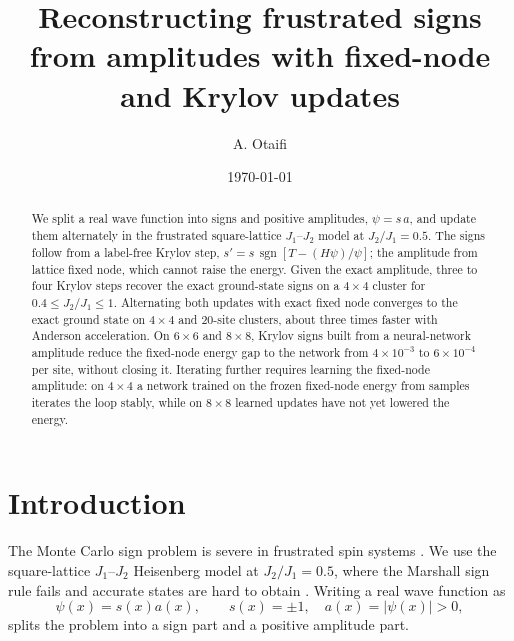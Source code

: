 \documentclass[aps,prb,reprint,onecolumn,superscriptaddress,floatfix]{revtex4-2}
\begin{document}
\title{Reconstructing frustrated signs from amplitudes with fixed-node and Krylov updates}

\author{A. Otaifi}
\date{\today}

\begin{abstract}
We split a real wave function into signs and positive amplitudes,
$\psi=s\,a$, and update them alternately in the frustrated square-lattice
$J_1$--$J_2$ model at $J_2/J_1=0.5$. The signs follow from a label-free
Krylov step, $s'=s\,\operatorname{sgn}[T-(H\psi)/\psi]$; the amplitude from
lattice fixed node, which cannot raise the energy. Given the exact amplitude,
three to four Krylov steps recover the exact ground-state signs on a
$4\times4$ cluster for $0.4\leq J_2/J_1\leq1$. Alternating both updates with
exact fixed node converges to the exact ground state on $4\times4$ and
20-site clusters, about three times faster with Anderson acceleration. On
$6\times6$ and $8\times8$, Krylov signs built from a neural-network amplitude
reduce the fixed-node energy gap to the network from $4\times10^{-3}$ to
$6\times10^{-4}$ per site, without closing it. Iterating further requires
learning the fixed-node amplitude: on $4\times4$ a network trained on the frozen
fixed-node energy from samples iterates the loop stably, while on $8\times8$
learned updates have not yet lowered the energy.
\end{abstract}

\maketitle

\section{Introduction}

The Monte Carlo sign problem is severe in frustrated spin systems
\cite{HeneliusSandvik2000,TroyerWiese2005}. We use the square-lattice
$J_1$--$J_2$ Heisenberg model at $J_2/J_1=0.5$, where the Marshall sign rule
\cite{Marshall1955} fails and accurate states are hard to obtain
\cite{Choo2019,ChenHeyl2024}. Writing a real wave function as
\begin{equation}
\psi(x)=s(x)a(x),\qquad s(x)=\pm1,\quad a(x)=|\psi(x)|>0,
\label{eq:decomp}
\end{equation}
splits the problem into a sign part and a positive amplitude part.
\end{document}
